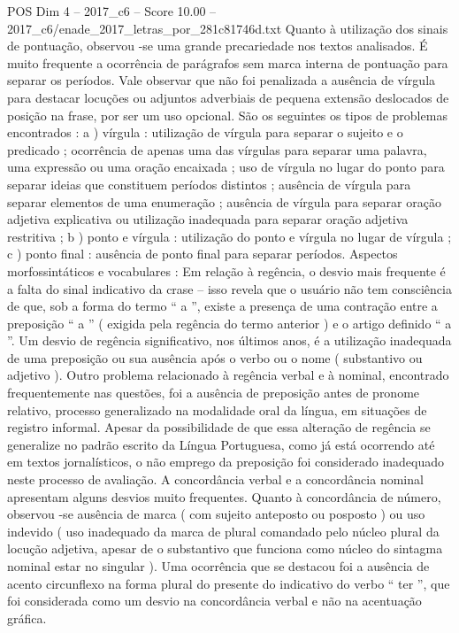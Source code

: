 \begin{textsample}{POS Dim 4 – 2017\_c6 – Score 10.00 – 2017\_c6/enade\_2017\_letras\_por\_281c81746d.txt}
Quanto à utilização dos sinais de pontuação, observou -se uma grande precariedade nos textos analisados.
É muito frequente a ocorrência de parágrafos sem marca interna de pontuação para separar os períodos.
Vale observar que não foi penalizada a ausência de vírgula para destacar locuções ou adjuntos adverbiais de pequena extensão deslocados de posição na frase, por ser um uso opcional.
São os seguintes os tipos de problemas encontrados : a ) vírgula : utilização de vírgula para separar o sujeito e o predicado ; ocorrência de apenas uma das vírgulas para separar uma palavra, uma expressão ou uma oração encaixada ; uso de vírgula no lugar do ponto para separar ideias que constituem períodos distintos ; ausência de vírgula para separar elementos de uma enumeração ; ausência de vírgula para separar oração adjetiva explicativa ou utilização inadequada para separar oração adjetiva restritiva ; b ) ponto e vírgula : utilização do ponto e vírgula no lugar de vírgula ; c ) ponto final : ausência de ponto final para separar períodos.
Aspectos morfossintáticos e vocabulares : Em relação à regência, o desvio mais frequente é a falta do sinal indicativo da crase – isso revela que o usuário não tem consciência de que, sob a forma do termo “ a ”, existe a presença de uma contração entre a preposição “ a ” ( exigida pela regência do termo anterior ) e o artigo definido “ a ”.
Um desvio de regência significativo, nos últimos anos, é a utilização inadequada de uma preposição ou sua ausência após o verbo ou o nome ( substantivo ou adjetivo ).
Outro problema relacionado à regência verbal e à nominal, encontrado frequentemente nas questões, foi a ausência de preposição antes de pronome relativo, processo generalizado na modalidade oral da língua, em situações de registro informal.
Apesar da possibilidade de que essa alteração de regência se generalize no padrão escrito da Língua Portuguesa, como já está ocorrendo até em textos jornalísticos, o não emprego da preposição foi considerado inadequado neste processo de avaliação.
A concordância verbal e a concordância nominal apresentam alguns desvios muito frequentes.
Quanto à concordância de número, observou -se ausência de marca ( com sujeito anteposto ou posposto ) ou uso indevido ( uso inadequado da marca de plural comandado pelo núcleo plural da locução adjetiva, apesar de o substantivo que funciona como núcleo do sintagma nominal estar no singular ).
Uma ocorrência que se destacou foi a ausência de acento circunflexo na forma plural do presente do indicativo do verbo “ ter ”, que foi considerada como um desvio na concordância verbal e não na acentuação gráfica.

\end{textsample}
